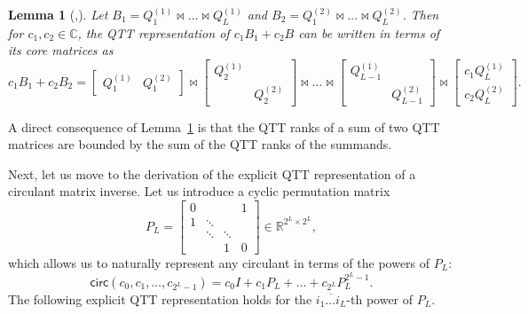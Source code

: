 \documentclass[a4paper]{article}
\newtheorem{lemma}{Lemma}[section]
\newcommand{\perm}{P}
\newcommand{\LL}{L}
\begin{document}
\begin{lemma}[\cite{khkaz-lap-2012},\cite{osel-tt-2011}] \label{lm:sumtt}
Let $B_1 = Q_1^{(1)} \Join \dots \Join Q_\LL^{(1)}$ and $B_2 = Q_1^{(2)} \Join \dots \Join Q_\LL^{(2)}$. Then for $c_1,c_2\in\mathbb{C}$, the QTT representation of $c_1 B_1 + c_2 B$ can be written in terms of its core matrices as
\[
    c_1 B_1 + c_2 B_2 = 
    \begin{bmatrix}
        Q_1^{(1)} & Q_1^{(2)}
    \end{bmatrix}
    \Join 
    \begin{bmatrix}
        Q_2^{(1)} \\ & Q_2^{(2)}
    \end{bmatrix}
    \Join 
    \dots 
    \Join
    \begin{bmatrix}
        Q_{\LL-1}^{(1)} \\ & Q_{\LL-1}^{(2)}
    \end{bmatrix}
    \Join
    \begin{bmatrix}
        c_1 Q_\LL^{(1)} \\  c_2 Q_\LL^{(2)}
    \end{bmatrix}.
\]
\end{lemma}
A direct consequence of Lemma~\ref{lm:sumtt} is that the QTT ranks of a sum of two QTT matrices are bounded by the sum of the QTT ranks of the summands.

Next, let us move to the derivation of the explicit QTT representation of a circulant matrix inverse. 
Let us introduce a cyclic permutation matrix
\[
    \perm_\LL = 
    \begin{bmatrix}
        0 & & & 1 \\
        1 & \ddots \\
        & \ddots & \ddots \\
        & & 1 & 0
    \end{bmatrix}\in\mathbb{R}^{2^\LL \times 2^\LL},
\]
which allows us to naturally represent any circulant in terms of the powers of $\perm_\LL$:
\[
    \mathsf{circ}(c_0,c_1,\dots, c_{2^{\LL}-1}) = c_0 I + c_1 P_\LL + \dots + c_{2^\LL} P_\LL^{2^\LL -1}.
\]
The following explicit QTT representation holds for the $\overline{i_1\dots i_\LL}$-th power of $\perm_\LL$.
\end{document}
